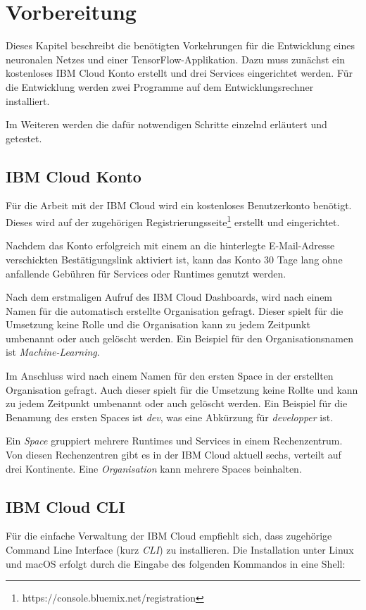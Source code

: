 \section{Vorbereitung}
Dieses Kapitel beschreibt die benötigten Vorkehrungen für die Entwicklung eines neuronalen Netzes und einer
TensorFlow-Applikation. Dazu muss zunächst ein kostenloses IBM Cloud Konto erstellt und drei Services eingerichtet
werden. Für die Entwicklung werden zwei Programme auf dem Entwicklungsrechner installiert.

Im Weiteren werden die dafür notwendigen Schritte einzelnd erläutert und getestet.

\subsection{IBM Cloud Konto}
Für die Arbeit mit der IBM Cloud wird ein kostenloses Benutzerkonto benötigt. Dieses wird auf der zugehörigen
Registrierungsseite\footnote{https://console.bluemix.net/registration} erstellt und eingerichtet.

Nachdem das Konto erfolgreich mit einem an die hinterlegte E-Mail-Adresse verschickten Bestätigungslink aktiviert ist,
kann das Konto 30 Tage lang ohne anfallende Gebühren für Services oder Runtimes genutzt werden.

Nach dem erstmaligen Aufruf des IBM Cloud Dashboards, wird nach einem Namen für die automatisch erstellte Organisation
gefragt. Dieser spielt für die Umsetzung keine Rolle und die Organisation kann zu jedem Zeitpunkt umbenannt oder auch
gelöscht werden. Ein Beispiel für den Organisationsnamen ist \textit{Machine-Learning}.

Im Anschluss wird nach einem Namen für den ersten Space in der erstellten Organisation gefragt. Auch dieser
spielt für die Umsetzung keine Rollte und kann zu jedem Zeitpunkt umbenannt oder auch gelöscht werden. Ein Beispiel für
die Benamung des ersten Spaces ist \textit{dev}, was eine Abkürzung für \textit{developper} ist.

Ein \textit{Space} gruppiert mehrere Runtimes und Services in einem Rechenzentrum. Von diesen Rechenzentren gibt es in
der IBM Cloud aktuell sechs, verteilt auf drei Kontinente. Eine \textit{Organisation} kann mehrere Spaces beinhalten.

\subsection{IBM Cloud CLI}
Für die einfache Verwaltung der IBM Cloud empfiehlt sich, dass zugehörige Command Line Interface (kurz \textit{CLI}) zu
installieren. Die Installation unter Linux und macOS erfolgt durch die Eingabe des folgenden Kommandos in eine Shell:

